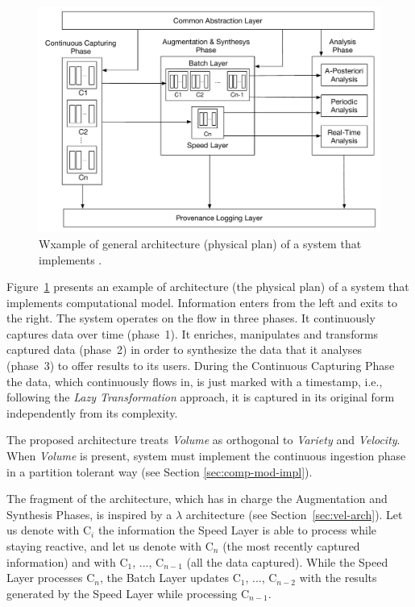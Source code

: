 {\begin{figure}[t]
    \centering
    \includegraphics[width=\columnwidth]{img/computational-model-architecture}
    \caption{Wxample of general architecture (physical plan) of a system that implements \textnormal{\protect\river{}}.}
    \label{fig:arch}
\end{figure}

Figure~\ref{fig:arch} presents an example of architecture (the physical plan) of a system that implements \river{} computational model. Information enters from the left and exits to the right.
The system operates on the flow in three phases. It continuously captures data over time (phase~1). It enriches, manipulates and transforms captured data (phase~2) in order to synthesize the data that it analyses (phase~3) to offer results to its users.  
During the Continuous Capturing Phase the data, which continuously flows in, is just marked with a timestamp, i.e., following the \textit{Lazy Transformation} approach, it is captured in its original form independently from its complexity.  

The proposed architecture treats \textit{Volume} as orthogonal to \textit{Variety} and \textit{Velocity}. When \textit{Volume} is present, system must implement the continuous ingestion phase in a partition tolerant way (see Section \ref{sec:comp-mod-impl}). 

The fragment of the architecture, which has in charge the Augmentation and Synthesis Phases, is inspired by a $\lambda$ architecture (see Section~\ref{sec:vel-arch}). 
Let us denote with C$_i$ the information the Speed Layer is able to process while staying reactive, and let us denote with C$_n$ (the most recently captured information) and with C$_1$, ..., C$_{n-1}$ (all the data captured). While the Speed Layer processes C$_n$, the Batch Layer updates C$_1$, ..., C$_{n-2}$ with the results generated by the Speed Layer while processing C$_{n-1}$.

}
